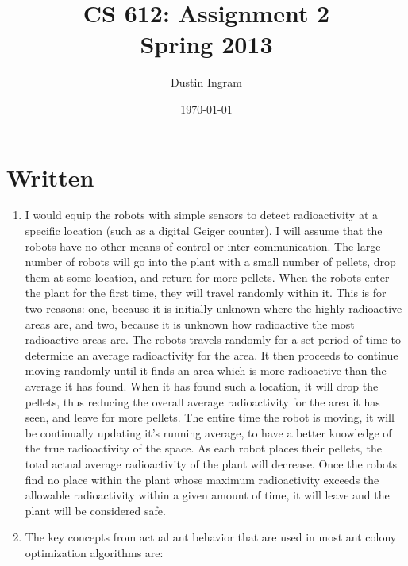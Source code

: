 \documentclass{article}
\title{CS 612: Assignment 2\\Spring 2013}
\author{Dustin Ingram}
\date{\today}
\begin{document}
\maketitle

\section*{Written}

\begin{enumerate}

\item{} %

I would equip the robots with simple sensors to detect radioactivity at a
specific location (such as a digital Geiger counter). I will assume that the
robots have no other means of control or inter-communication. The large number
of robots will go into the plant with a small number of pellets, drop them at
some location, and return for more pellets. When the robots enter the plant for
the first time, they will travel randomly within it. This is for two reasons:
one, because it is initially unknown where the highly radioactive areas are, and
two, because it is unknown how radioactive the most radioactive areas are. The
robots travels randomly for a set period of time to determine an average
radioactivity for the area. It then proceeds to continue moving randomly until
it finds an area which is more radioactive than the average it has found. When
it has found such a location, it will drop the pellets, thus reducing the
overall average radioactivity for the area it has seen, and leave for more
pellets. The entire time the robot is moving, it will be continually updating
it's running average, to have a better knowledge of the true radioactivity of
the space. As each robot places their pellets, the total actual average
radioactivity of the plant will decrease. Once the robots find no place within
the plant whose maximum radioactivity exceeds the allowable radioactivity within
a given amount of time, it will leave and the plant will be considered safe.

\item{} %

The key concepts from actual ant behavior that are used in most ant colony
optimization algorithms are:


\end{enumerate}
\end{document}
